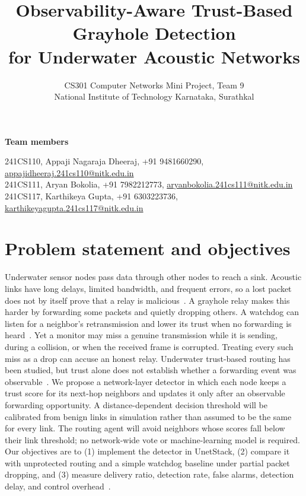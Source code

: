 \documentclass[11pt]{article}
\title{\vspace{-1.2cm}\bfseries Observability-Aware Trust-Based Grayhole Detection\\for Underwater Acoustic Networks}
\author{CS301 Computer Networks Mini Project, Team 9\\
National Institute of Technology Karnataka, Surathkal}
\date{}
\begin{document}
\maketitle
\vspace{-1.1cm}

\noindent\textbf{Team members}\par
\smallskip
\noindent 241CS110, Appaji Nagaraja Dheeraj, +91 9481660290, \href{mailto:appajidheeraj.241cs110@nitk.edu.in}{appajidheeraj.241cs110@nitk.edu.in}\\
241CS111, Aryan Bokolia, +91 7982212773, \href{mailto:aryanbokolia.241cs111@nitk.edu.in}{aryanbokolia.241cs111@nitk.edu.in}\\
241CS117, Karthikeya Gupta, +91 6303223736, \href{mailto:karthikeyagupta.241cs117@nitk.edu.in}{karthikeyagupta.241cs117@nitk.edu.in}

\section*{Problem statement and objectives}
Underwater sensor nodes pass data through other nodes to reach a sink. Acoustic links have long delays, limited bandwidth, and frequent errors, so a lost packet does not by itself prove that a relay is malicious~\cite{akyildiz2005}. A grayhole relay makes this harder by forwarding some packets and quietly dropping others. A watchdog can listen for a neighbor's retransmission and lower its trust when no forwarding is heard~\cite{marti2000}. Yet a monitor may miss a genuine transmission while it is sending, during a collision, or when the received frame is corrupted. Treating every such miss as a drop can accuse an honest relay. Underwater trust-based routing has been studied, but trust alone does not establish whether a forwarding event was observable~\cite{han2023}. We propose a network-layer detector in which each node keeps a trust score for its next-hop neighbors and updates it only after an observable forwarding opportunity. A distance-dependent decision threshold will be calibrated from benign links in simulation rather than assumed to be the same for every link. The routing agent will avoid neighbors whose scores fall below their link threshold; no network-wide vote or machine-learning model is required. Our objectives are to (1) implement the detector in UnetStack, (2) compare it with unprotected routing and a simple watchdog baseline under partial packet dropping, and (3) measure delivery ratio, detection rate, false alarms, detection delay, and control overhead~\cite{chitre2014}.
\end{document}

